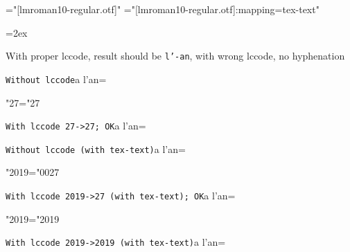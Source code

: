 \font\fontA="[lmroman10-regular.otf]"
\font\fontB="[lmroman10-regular.otf]:mapping=tex-text"


\newdimen\savehsize \savehsize\hsize
\parskip=2ex

\def\test#1#2{{\tt#1}\endgraf\hsize=3pt\noindent #2\endgraf\hsize=\savehsize}

\def\testA#1{\test{#1}{a l'an}}

\fontA

\noindent With proper lccode, result should be {\tt l'-an}, with wrong lccode, no hyphenation\par\strut

\testA{Without lccode}

\lccode"27="27

\testA{With lccode 27->27; OK}

\par\strut\par\strut\par
\fontB

\testA{Without lccode (with tex-text)}

\lccode"2019="0027

\testA{With lccode 2019->27 (with tex-text); OK}

\lccode"2019="2019

\testA{With lccode 2019->2019 (with tex-text)}

\bye
